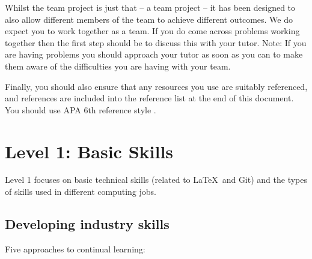 \documentclass[a4paper, 11pt]{report}
\begin{document}
	Whilst the team project is just that -- a team project -- it has been designed to also allow different members of the team to achieve different outcomes. We do expect you to work together as a team. If you do come across problems working together then the first step should be to discuss this with your tutor. Note: If you are having problems you should approach your tutor as soon as you can to make them aware of the difficulties you are having with your team.

	Finally, you should also ensure that any resources you use are suitably referenced, and references are included into the reference list at the end of this document. You should use APA 6th reference style \cite{apa6}.


	\newpage
	\section{Level 1: Basic Skills}

	Level 1 focuses on basic technical skills (related to \LaTeX\ and Git) and the types of skills used in different computing jobs.

	\subsection{Developing industry skills}

	Five approaches to continual learning:
\end{document}
